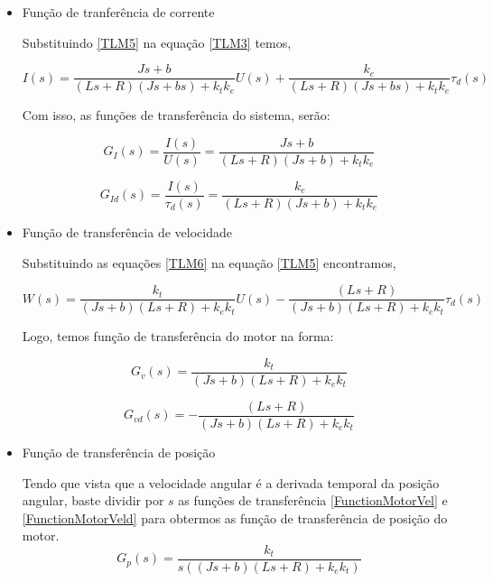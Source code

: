 \documentclass[]{politex}
\begin{document}
\begin{itemize}

\item Função de tranferência de corrente

    Substituindo \eqref{TLM5} na equação \eqref{TLM3} temos,

    \begin{equation}
    \label{TLM6}
    I(s) = \frac{J s + b}{(L s + R) ( J s + b s) +  k_{t} k_{e}} U(s) + \frac{k_{e}}{(L s + R) ( J s + b s) +  k_{t} k_{e}} \tau_{d}(s)
    \end{equation}

    Com isso, as funções de transferência do sistema, serão:

    \begin{equation}
    \label{functionTransferMotor}
        G_{I}(s) = \frac{I(s)}{U(s)} = \frac{J s+b}{(L s + R) (J s+b)+k_{t}k_{e}}
    \end{equation}

    \begin{equation}
    \label{functionTransferDist}
        G_{Id}(s) = \frac{I(s)}{\tau_{d}(s)} = \frac{k_{e}}{(L s + R)( J s+b)+k_{t}k_{e}}
    \end{equation}

\item Função de transferência de velocidade

Substituindo as equações \eqref{TLM6} na equação \eqref{TLM5} encontramos,

    \begin{equation}
     W(s) = \frac{k_{t}}{(J s + b)(L s + R) + k_{e} k_{t}} U(s) - \frac{(L s + R)}{(J s + b)(L s + R) + k_{e} k_{t}} \tau_d(s)
    \end{equation}

    Logo, temos função de transferência do motor na forma:
    
    \begin{equation}
    \label{FunctionMotorVel}
     G_v(s) = \frac{k_{t}}{(J s + b)(L s + R) + k_{e} k_{t}} 
    \end{equation}
    
    \begin{equation}
    \label{FunctionMotorVeld}
     G_{vd}(s) = - \frac{(L s + R)}{(J s + b)(L s + R) + k_{e} k_{t}}
    \end{equation}
    
\item Função de transferência de posição

Tendo que vista que a velocidade angular é a derivada temporal da posição angular, baste dividir por $s$ as funções de transferência \eqref{FunctionMotorVel} e \eqref{FunctionMotorVeld} para obtermos as função de transferência de posição do motor.
    \begin{equation}
    \label{FunctionMotor}
     G_p(s) = \frac{k_{t}}{s((J s + b)(L s + R) + k_{e} k_{t})}
    \end{equation}
    

\end{itemize}
\end{document}
